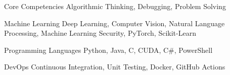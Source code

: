 

\begin{cvskills}

  \cvskill
    {Core Competencies} %
    {Algorithmic Thinking, Debugging, Problem Solving} %


    

 \cvskill
    {Machine Learning} %
    {Deep Learning, Computer Vision, Natural Language Processing, Machine Learning Security, PyTorch, Scikit-Learn} %
    
  \cvskill
    {Programming Languages} %
    {Python, Java, C, CUDA, C\#, PowerShell} %

  \cvskill
    {DevOps} %
    {Continuous Integration, Unit Testing, Docker, GitHub Actions} %
    


\end{cvskills}
